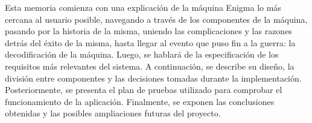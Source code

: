 Esta memoria comienza con una explicación de la máquina Enigma lo más cercana al usuario posible, 
navegando a través de los componentes de la máquina, pasando por la historia de la misma, uniendo las 
complicaciones y las razones detrás del éxito de la misma, hasta llegar al evento que puso fin a la guerra:
la decodificación de la máquina. 
Luego, se hablará de la especificación de los requisitos más relevantes del
sistema. A continuación, se describe su diseño, la división entre componentes y las
decisiones tomadas durante la implementación. Posteriormente, se presenta el plan de
pruebas utilizado para comprobar el funcionamiento de la aplicación. Finalmente, se
exponen las conclusiones obtenidas y las posibles ampliaciones futuras del proyecto.






